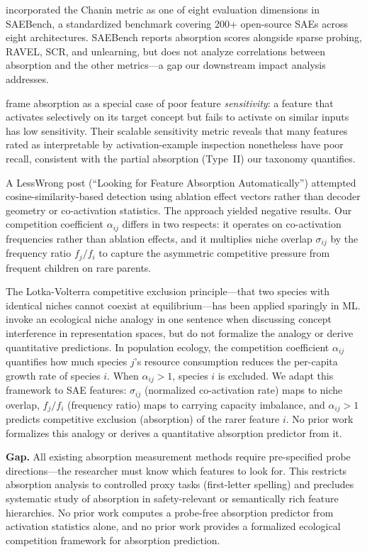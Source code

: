 \documentclass{article}
\begin{document}
\citet{karvonen2025saebench} incorporated the Chanin metric as one of eight evaluation dimensions in SAEBench, a standardized benchmark covering 200+ open-source SAEs across eight architectures. SAEBench reports absorption scores alongside sparse probing, RAVEL, SCR, and unlearning, but does not analyze correlations between absorption and the other metrics---a gap our downstream impact analysis addresses.

\citet{tian2025sensitivity} frame absorption as a special case of poor feature \emph{sensitivity}: a feature that activates selectively on its target concept but fails to activate on similar inputs has low sensitivity. Their scalable sensitivity metric reveals that many features rated as interpretable by activation-example inspection nonetheless have poor recall, consistent with the partial absorption (Type~II) our taxonomy quantifies.

A LessWrong post (``Looking for Feature Absorption Automatically'') attempted cosine-similarity-based detection using ablation effect vectors rather than decoder geometry or co-activation statistics. The approach yielded negative results. Our competition coefficient $\alpha_{ij}$ differs in two respects: it operates on co-activation frequencies rather than ablation effects, and it multiplies niche overlap $\sigma_{ij}$ by the frequency ratio $f_j / f_i$ to capture the asymmetric competitive pressure from frequent children on rare parents.

The Lotka-Volterra competitive exclusion principle---that two species with identical niches cannot coexist at equilibrium---has been applied sparingly in ML. \citet{park2025geometry} invoke an ecological niche analogy in one sentence when discussing concept interference in representation spaces, but do not formalize the analogy or derive quantitative predictions. In population ecology, the competition coefficient $\alpha_{ij}$ quantifies how much species $j$'s resource consumption reduces the per-capita growth rate of species $i$. When $\alpha_{ij} > 1$, species $i$ is excluded. We adapt this framework to SAE features: $\sigma_{ij}$ (normalized co-activation rate) maps to niche overlap, $f_j / f_i$ (frequency ratio) maps to carrying capacity imbalance, and $\alpha_{ij} > 1$ predicts competitive exclusion (absorption) of the rarer feature $i$. No prior work formalizes this analogy or derives a quantitative absorption predictor from it.

\textbf{Gap.} All existing absorption measurement methods require pre-specified probe directions---the researcher must know which features to look for. This restricts absorption analysis to controlled proxy tasks (first-letter spelling) and precludes systematic study of absorption in safety-relevant or semantically rich feature hierarchies. No prior work computes a probe-free absorption predictor from activation statistics alone, and no prior work provides a formalized ecological competition framework for absorption prediction.
\end{document}
